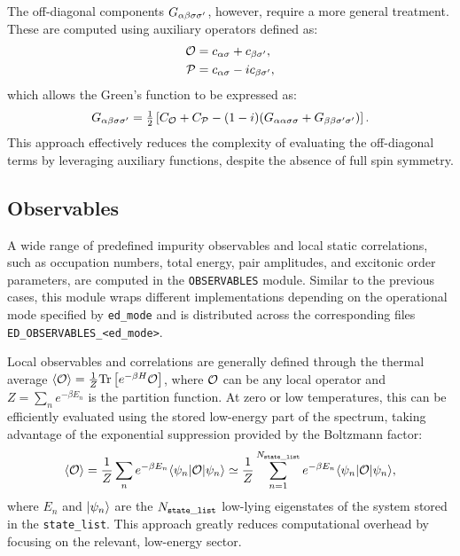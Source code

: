 \documentclass[edipack_sp.tex]{subfiles}
\begin{document}
The off-diagonal components $G_{\alpha\beta\sigma\sigma'}$, however, 
require a more general treatment. These are computed using 
auxiliary operators defined as:
\begin{align*}
{\cal O} &= c_{\alpha\sigma} + c_{\beta\sigma'}, \\
{\cal P} &= c_{\alpha\sigma} - i c_{\beta\sigma'},
\end{align*}
which allows the Green's function to be expressed as:
\begin{equation}
G_{\alpha\beta\sigma\sigma'} = \tfrac{1}{2} \left[ C_{\cal O} + C_{\cal P} - 
(1-i)(G_{\alpha\alpha\sigma\sigma} + G_{\beta\beta\sigma'\sigma'}) \right].
\end{equation}
This approach effectively reduces the complexity of 
evaluating the off-diagonal terms by leveraging auxiliary 
functions, despite the absence of full spin symmetry.





\subsection{Observables}\label{sSecObc}
A wide range of predefined impurity observables and local 
static correlations, such as occupation numbers, total 
energy, pair amplitudes, and excitonic order parameters, 
are computed in the \texttt{OBSERVABLES} module. Similar to the
previous cases, this module wraps different implementations 
depending on the operational mode specified by 
{\tt ed\_mode} and is distributed across the corresponding 
files {\tt ED\_OBSERVABLES\_<ed\_mode>}. 



Local observables and correlations are generally defined 
through the thermal average 
$\langle {\cal O}\rangle = \tfrac{1}{Z}{\rm Tr}\left[e^{-\beta H}{\cal O}\right]$, 
where ${\cal O}$ can be any local operator and  $Z = \sum_n e^{-\beta E_n}$ is the partition function. 
At zero or low temperatures, this can be efficiently 
evaluated using the stored low-energy part of the spectrum, 
taking advantage of the exponential suppression provided by 
the Boltzmann factor:
\begin{equation}
\langle {\cal O}\rangle = \frac{1}{Z}\sum_n e^{-\beta E_n}
\langle \psi_n| {\cal O} |\psi_n\rangle\simeq \frac{1}{Z}\sum_{n=1}^{N_{\tt state\_list}} e^{-\beta E_n}
\langle \psi_n| {\cal O} |\psi_n\rangle,
\label{eq:thermal_average}
\end{equation}
where $E_n$ and $|\psi_n\rangle$ are the $N_{\tt state\_list}$ low-lying eigenstates 
of the system stored in the {\tt state\_list}. This approach 
greatly reduces computational overhead by focusing on the 
relevant, low-energy sector.
\end{document}
